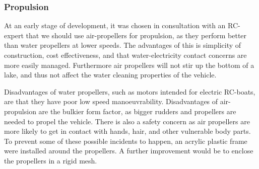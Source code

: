 

\subsubsection{Propulsion}

At an early stage of development, it was chosen in consultation with an RC-expert that we should use air-propellers for propulsion, as they perform better than water propellers at lower speeds. The advantages of this is simplicity of construction, cost effectiveness, and that water-electricity contact concerns are more easily managed. Furthermore air propellers will not stir up the bottom of a lake, and thus not affect the water cleaning properties of the vehicle.

Disadvantages of water propellers, such as motors intended for electric RC-boats, are that they have poor low speed manoeuvrability. Disadvantages of air-propulsion are the bulkier form factor, as bigger rudders and propellers are needed to propel the vehicle. There is also a safety concern as air propellers are more likely to get in contact with hands, hair, and other vulnerable body parts. To prevent some of these possible incidents to happen, an acrylic plastic frame were installed around the propellers. A further improvement would be to enclose the propellers in a rigid mesh.


